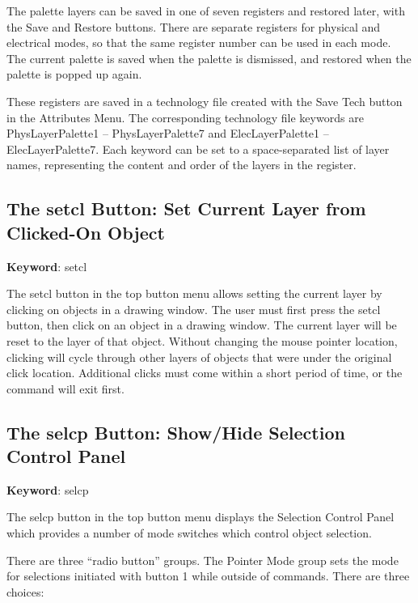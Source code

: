 The palette layers can be saved in one of seven registers and restored
later, with the {\cb Save} and {\cb Restore} buttons.  There are
separate registers for physical and electrical modes, so that the same
register number can be used in each mode.  The current palette is
saved when the palette is dismissed, and restored when the palette is
popped up again.

These registers are saved in a technology file created with the {\cb
Save Tech} button in the {\cb Attributes Menu}.  The corresponding
technology file keywords are {\vt PhysLayerPalette1} -- {\vt
PhysLayerPalette7} and {\vt ElecLayerPalette1} -- {\vt
ElecLayerPalette7}.  Each keyword can be set to a space-separated list
of layer names, representing the content and order of the layers in
the register.

\subsection{The {\cb setcl} Button: Set Current Layer from Clicked-On Object}

{\bf Keyword}: {\vt setcl}

The {\cb setcl} button in the top button menu allows setting the
current layer by clicking on objects in a drawing window.  The user
must first press the {\cb setcl} button, then click on an object in a
drawing window.  The current layer will be reset to the layer of that
object.  Without changing the mouse pointer location, clicking will
cycle through other layers of objects that were under the original
click location.  Additional clicks must come within a short period of
time, or the command will exit first.

\subsection{The {\cb selcp} Button: Show/Hide Selection Control Panel}
\label{selcontrol}

{\bf Keyword}: {\vt selcp}

The {\cb selcp} button in the top button menu displays the {\cb
Selection Control Panel} which provides a number of mode switches
which control object selection.

There are three ``radio button'' groups.  The {\cb Pointer Mode} group
sets the mode for selections initiated with button 1 while outside
of commands.  There are three choices:

